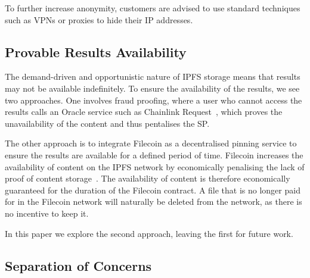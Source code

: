 \documentclass[pdftex,twocolumn,epjc3]{svjour3}
\begin{document}
To further increase anonymity, customers are advised to use standard techniques such as VPNs or proxies to hide their IP addresses.

\subsection{Provable Results Availability}

The demand-driven and opportunistic nature of IPFS storage means that results may not be available indefinitely.
To ensure the availability of the results, we see two approaches. One involves fraud proofing, where a user who cannot access the results calls an Oracle service such as Chainlink Request~\cite{breidenbachChainlinkNextSteps2021, ChainlinkMakeGET}, which proves the unavailability of the content and thus pentalises the SP. 

The other approach is to integrate Filecoin as a decentralised pinning service to ensure the results are available for a defined period of time. Filecoin increases the availability of content on the IPFS network by economically penalising the lack of proof of content storage~\cite{filecoinSlashing}. The availability of content is therefore economically guaranteed for the duration of the Filecoin contract.
A file that is no longer paid for in the Filecoin network will naturally be deleted from the network, as there is no incentive to keep it.

In this paper we explore the second approach, leaving the first for future work.
\subsection{Separation of Concerns}\label{sec:separation-of-concerns}
\end{document}
